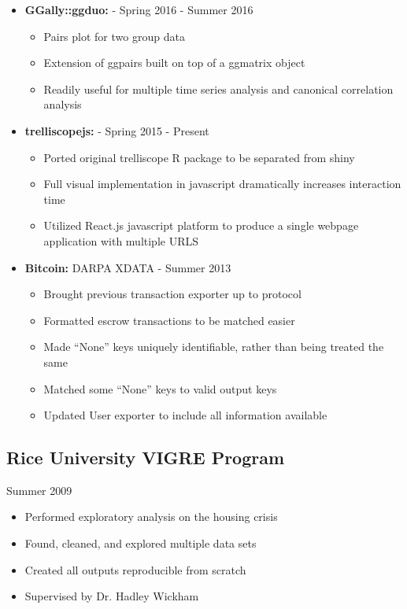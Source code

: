 \documentclass[oneside]{article}
\begin{document}
\begin{itemize}
  \item{\bf GGally::ggduo:} - Spring 2016 - Summer 2016
    \begin{itemize}
      \item Pairs plot for two group data
      \item Extension of ggpairs built on top of a ggmatrix object
      \item Readily useful for multiple time series analysis and canonical correlation analysis
    \end{itemize}

  \item{\bf trelliscopejs:} - Spring 2015 - Present
    \begin{itemize}
      \item Ported original trelliscope R package to be separated from shiny
      \item Full visual implementation in javascript dramatically increases interaction time
      \item Utilized React.js javascript platform to produce a single webpage application with multiple URLS
    \end{itemize}


  \item{\bf Bitcoin:} DARPA XDATA - Summer 2013
    \begin{itemize}
      \item Brought previous transaction exporter up to protocol
      \item Formatted escrow transactions to be matched easier
      \item Made ``None'' keys uniquely identifiable, rather than being treated the same
      \item Matched some ``None'' keys to valid output keys
      \item Updated User exporter to include all information available
    \end{itemize}
\end{itemize}


\subsection{Rice University VIGRE Program} Summer 2009
\begin{itemize}
  \item Performed exploratory analysis on the housing crisis
  \item Found, cleaned, and explored multiple data sets
  \item Created all outputs reproducible from scratch
  \item Supervised by Dr. Hadley Wickham
\end{itemize}
\end{document}
